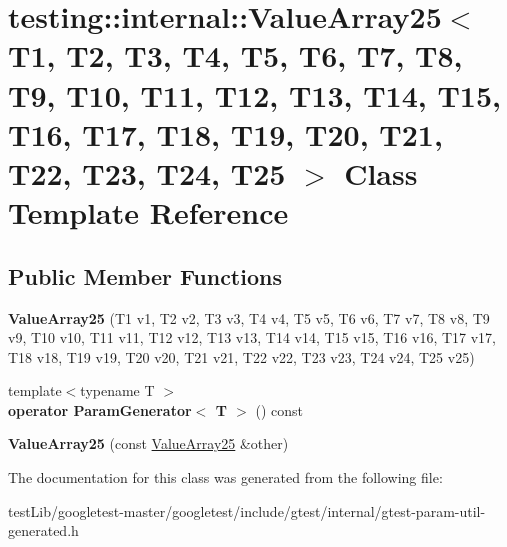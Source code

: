 \hypertarget{classtesting_1_1internal_1_1ValueArray25}{}\section{testing\+:\+:internal\+:\+:Value\+Array25$<$ T1, T2, T3, T4, T5, T6, T7, T8, T9, T10, T11, T12, T13, T14, T15, T16, T17, T18, T19, T20, T21, T22, T23, T24, T25 $>$ Class Template Reference}
\label{classtesting_1_1internal_1_1ValueArray25}
\subsection*{Public Member Functions}
\begin{DoxyCompactItemize}
\item 
\mbox{\label{classtesting_1_1internal_1_1ValueArray25_a8e4f816b4e038c6851fb66066430b226}} 
{\bfseries Value\+Array25} (T1 v1, T2 v2, T3 v3, T4 v4, T5 v5, T6 v6, T7 v7, T8 v8, T9 v9, T10 v10, T11 v11, T12 v12, T13 v13, T14 v14, T15 v15, T16 v16, T17 v17, T18 v18, T19 v19, T20 v20, T21 v21, T22 v22, T23 v23, T24 v24, T25 v25)
\item 
\mbox{\label{classtesting_1_1internal_1_1ValueArray25_ad861f628c2490518a2f2cc18fd709607}} 
{\footnotesize template$<$typename T $>$ }\\{\bfseries operator Param\+Generator$<$ T $>$} () const
\item 
\mbox{\label{classtesting_1_1internal_1_1ValueArray25_a38557aeef2acf50afd6fa6f10f33a99c}} 
{\bfseries Value\+Array25} (const \hyperlink{classtesting_1_1internal_1_1ValueArray25}{Value\+Array25} \&other)
\end{DoxyCompactItemize}


The documentation for this class was generated from the following file\+:\begin{DoxyCompactItemize}
\item 
test\+Lib/googletest-\/master/googletest/include/gtest/internal/gtest-\/param-\/util-\/generated.\+h\end{DoxyCompactItemize}
